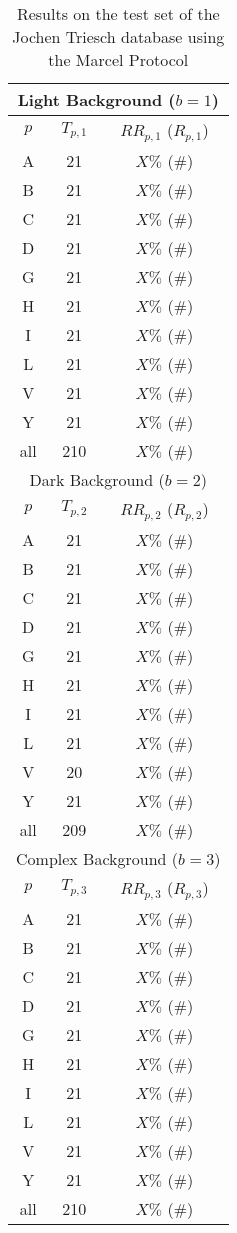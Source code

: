 \begin{table}
\caption{ \label{ResultsRecoSM} Results on the test set of the Jochen Triesch database using the Marcel Protocol}
\begin{center}
\begin{tabular}{ccc}
\hline
\multicolumn{3}{c}{Light Background ($b=1$)}\\
\hline
$p$ & $T_{p, 1}$ & $RR_{p, 1}$ ($R_{p, 1}$)\\
\hline
A  & 21 &  $X \%$ ($\#$)\\
B  & 21 &  $X \%$ ($\#$)\\
C  & 21 &  $X \%$ ($\#$)\\
D  & 21 &  $X \%$ ($\#$)\\
G  & 21 &  $X \%$ ($\#$)\\
H  & 21 &  $X \%$ ($\#$)\\
I  & 21 &  $X \%$ ($\#$)\\
L  & 21 &  $X \%$ ($\#$)\\
V  & 21 &  $X \%$ ($\#$)\\
Y  & 21 &  $X \%$ ($\#$)\\
all & 210 &  $X \%$ ($\#$)\\
\hline
\multicolumn{3}{c}{Dark Background ($b=2$)}\\
\hline
$p$ & $T_{p, 2}$ & $RR_{p, 2}$ ($R_{p, 2}$)\\
\hline
A  & 21 &  $X \%$ ($\#$)\\
B  & 21 &  $X \%$ ($\#$)\\
C  & 21 &  $X \%$ ($\#$)\\
D  & 21 &  $X \%$ ($\#$)\\
G  & 21 &  $X \%$ ($\#$)\\
H  & 21 &  $X \%$ ($\#$)\\
I  & 21 &  $X \%$ ($\#$)\\
L  & 21 &  $X \%$ ($\#$)\\
V  & 20 &  $X \%$ ($\#$)\\
Y  & 21 &  $X \%$ ($\#$)\\
all & 209 &  $X \%$ ($\#$)\\
\hline
\multicolumn{3}{c}{Complex Background ($b=3$)}\\
\hline
$p$ & $T_{p, 3}$ & $RR_{p, 3}$ ($R_{p, 3}$)\\
\hline
A  & 21 &  $X \%$ ($\#$)\\
B  & 21 &  $X \%$ ($\#$)\\
C  & 21 &  $X \%$ ($\#$)\\
D  & 21 &  $X \%$ ($\#$)\\
G  & 21 &  $X \%$ ($\#$)\\
H  & 21 &  $X \%$ ($\#$)\\
I  & 21 &  $X \%$ ($\#$)\\
L  & 21 &  $X \%$ ($\#$)\\
V  & 21 &  $X \%$ ($\#$)\\
Y  & 21 &  $X \%$ ($\#$)\\
all & 210 &  $X \%$ ($\#$)\\
\hline
\end{tabular}
\end{center}
\end{table}

